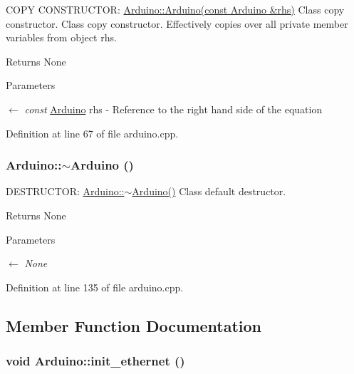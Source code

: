 COPY CONSTRUCTOR: \hyperlink{classArduino_abb555c50c1812b3b81211ffc490ff70f_abb555c50c1812b3b81211ffc490ff70f}{Arduino::Arduino(const Arduino \&rhs)} Class copy constructor. Class copy constructor. Effectively copies over all private member variables from object rhs.

\begin{DoxyReturn}{Returns}
None 
\end{DoxyReturn}

\begin{DoxyParams}{Parameters}
\item[\mbox{$\leftarrow$} {\em const}]\hyperlink{classArduino}{Arduino} rhs -\/ Reference to the right hand side of the equation \end{DoxyParams}


Definition at line 67 of file arduino.cpp.\hypertarget{classArduino_a9e70a2c4fd95f0a432845209ec3b6c11_a9e70a2c4fd95f0a432845209ec3b6c11}{
\subsubsection[{$\sim$Arduino}]{\setlength{\rightskip}{0pt plus 5cm}Arduino::$\sim$Arduino ()}}
\label{classArduino_a9e70a2c4fd95f0a432845209ec3b6c11_a9e70a2c4fd95f0a432845209ec3b6c11}


DESTRUCTOR: \hyperlink{classArduino_a9e70a2c4fd95f0a432845209ec3b6c11_a9e70a2c4fd95f0a432845209ec3b6c11}{Arduino::$\sim$Arduino()} Class default destructor. \begin{DoxyReturn}{Returns}
None 
\end{DoxyReturn}

\begin{DoxyParams}{Parameters}
\item[\mbox{$\leftarrow$} {\em None}]\end{DoxyParams}


Definition at line 135 of file arduino.cpp.

\subsection{Member Function Documentation}
\hypertarget{classArduino_a1839d0c9bcb7c8b7f3fef2d8ac9eaad0_a1839d0c9bcb7c8b7f3fef2d8ac9eaad0}{
\subsubsection[{init\_\-ethernet}]{\setlength{\rightskip}{0pt plus 5cm}void Arduino::init\_\-ethernet ()}}
\label{classArduino_a1839d0c9bcb7c8b7f3fef2d8ac9eaad0_a1839d0c9bcb7c8b7f3fef2d8ac9eaad0}


